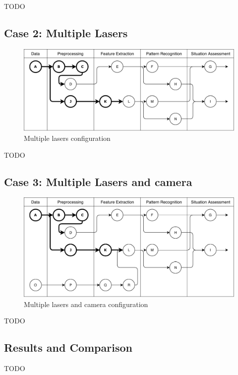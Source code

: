 TODO


\subsection{Case 2: Multiple Lasers}

\begin{figure}[ht!]
\centering
\includegraphics[scale=0.7]{fig/4/test_configuration2.pdf}
\caption{Multiple lasers configuration}
\label{tconf2}
\end{figure}

TODO

\subsection{Case 3: Multiple Lasers and camera}

\begin{figure}[ht!]
\centering
\includegraphics[scale=0.7]{fig/4/test_configuration3.pdf}
\caption{Multiple lasers and camera configuration}
\label{tconf3}
\end{figure}

TODO

\subsection{Results and Comparison}

TODO
